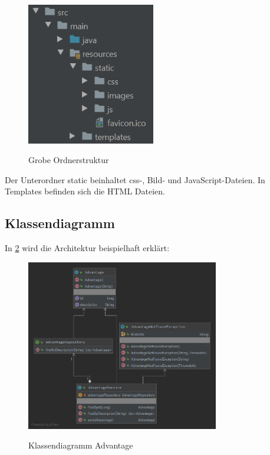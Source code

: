 \begin{figure}[htb]
    \centering
    \begin{minipage}[H]{1\textwidth}
        \caption{Grobe Ordnerstruktur}
        \includegraphics[width=0.5\textwidth]{img/resources-ordner.png}\\
        \label{fig:resources-ordner}
    \end{minipage}
\end{figure}

Der Unterordner static beinhaltet css-, Bild- und JavaScript-Dateien. In Templates befinden sich die HTML Dateien.

\subsection{Klassendiagramm}
In \cref{fig:advantage-klassendiagramm} wird die Architektur beispielhaft erklärt:

\begin{figure}[htb]
    \centering
    \begin{minipage}[H]{1\textwidth}
        \caption{Klassendiagramm Advantage}
        \includegraphics[width=0.75\textwidth]{img/advantage-klassendiagramm.png}\\
        \label{fig:advantage-klassendiagramm}
    \end{minipage}
\end{figure}


